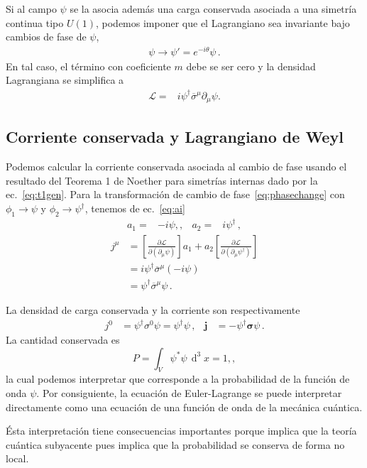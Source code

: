 \begin{frame}
Si al campo $\psi$ se la asocia además una carga conservada asociada a una simetría continua tipo $U(1)$, podemos imponer que el Lagrangiano sea invariante bajo cambios de fase de $\psi$, 
\begin{align}
  \label{eq:phasechange}
  \psi\to \psi'=e^{-i\theta}\psi\,.
\end{align}
En tal caso, el término con coeficiente $m$ debe se ser cero y la densidad Lagrangiana se simplifica a
\begin{align}
  \label{eq:masslesweylL}
   \mathcal{L}=&i{\psi}^{\dagger}\overline{\sigma}^\mu\partial_\mu\psi.
\end{align}
\end{frame}



\subsection{Corriente conservada y Lagrangiano de Weyl}
\label{sec:corriente-conservada}
\begin{frame}
  Podemos calcular la corriente conservada asociada al cambio de fase
  usando el resultado del Teorema 1 de Noether para simetrías internas  dado por la ec.~\eqref{eq:t1gen}. Para la transformación de cambio de fase~\eqref{eq:phasechange} con $\phi_1\to \psi$ y $\phi_2\to \psi^{\dagger}$, tenemos de ec.~\eqref{eq:ai}
  \begin{align}
    a_{1}=&-i\psi,,&      a_{2}=&i\psi^{\dagger}\,,
  \end{align}
\begin{align}
   j^\mu&=\left[\frac{\partial\mathcal{L}}{\partial\left(\partial_\mu\psi\right)}\right]a_1+a_2\left[\frac{\partial\mathcal{L}}{\partial\left(\partial_\mu\psi^\dagger\right)}\right]\nonumber\\
   &= i\psi^\dagger \overline{\sigma}^\mu(-i\psi)\nonumber\\
   &=\psi^\dagger \overline{\sigma}^\mu\psi\,.
\end{align}

La  densidad de carga conservada y la corriente son respectivamente
\begin{align}
  j^0&= \psi^\dagger \sigma^0\psi=\psi^{\dagger}\psi\,,&
  \boldsymbol{j}&=-\psi^{\dagger}\boldsymbol{\sigma} \psi\,.
\end{align}
La cantidad conservada es
\begin{equation}
  \label{eq:57}
P=  \int_V \psi^*\psi \,\operatorname{d}^3x=1,,
\end{equation}
la cual podemos interpretar que corresponde a la probabilidad de la función de onda $\psi$. Por consiguiente, la ecuación de Euler-Lagrange se puede interpretar directamente como una ecuación de una función de onda de la mecánica cuántica.


Ésta interpretación tiene consecuencias importantes porque implica que la teoría cuántica subyacente pues implica que la probabilidad se conserva de forma no local. 
\end{frame}

